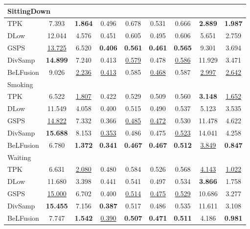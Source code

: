 \documentclass[10pt,twocolumn,letterpaper]{article}
\begin{document}
\begin{table*}[t!]
\begin{minipage}{0.495\textwidth}
\begin{tabular}{lcccccccc@{\hskip 2mm}}
\multicolumn{2}{l}{SittingDown} \\
\midrule
TPK & 7.393 & \textbf{1.864} & 0.496 & 0.678 & 0.531 & 0.666 & \textbf{2.889} & \textbf{1.987} \\
DLow & 12.044 & 4.576 & 0.451 & 0.605 & 0.495 & 0.606 & 5.651 & 2.759 \\
GSPS & \underline{13.725} & 6.520 & \textbf{0.406} & \textbf{0.561} & \textbf{0.461} & \textbf{0.565} & 9.301 & 3.694 \\
DivSamp & \textbf{14.899} & 7.240 & 0.413 & \underline{0.579} & 0.478 & \underline{0.586} & 11.929 & 3.471 \\
BeLFusion & 9.026 & \underline{2.236} & \underline{0.413} & 0.585 & \underline{0.468} & 0.587 & \underline{2.997} & \underline{2.642} \\
\midrule

Smoking \\
\midrule
TPK & 6.522 & \underline{1.807} & 0.422 & 0.529 & 0.509 & 0.560 & \textbf{3.148} & \underline{1.652} \\
DLow & 11.549 & 4.058 & 0.400 & 0.515 & 0.490 & 0.537 & 5.123 & 3.535 \\
GSPS & \underline{14.822} & 7.332 & 0.366 & \underline{0.485} & \underline{0.472} & 0.530 & 11.478 & 4.622 \\
DivSamp & \textbf{15.688} & 8.153 & \underline{0.353} & 0.486 & 0.475 & \underline{0.523} & 14.041 & 4.258 \\
BeLFusion & 6.780 & \textbf{1.372} & \textbf{0.341} & \textbf{0.467} & \textbf{0.467} & \textbf{0.512} & \underline{3.849} & \textbf{0.847} \\
\midrule

Waiting \\
\midrule
TPK & 6.631 & \underline{2.080} & 0.480 & 0.584 & 0.526 & 0.568 & \underline{4.143} & \underline{1.022} \\
DLow & 11.680 & 3.398 & 0.441 & 0.541 & 0.497 & 0.534 & \textbf{3.866} & 1.758 \\
GSPS & \underline{15.000} & 6.702 & 0.400 & \underline{0.514} & \underline{0.475} & \underline{0.529} & 10.686 & 3.277 \\
DivSamp & \textbf{15.455} & 7.156 & \textbf{0.387} & 0.517 & 0.486 & 0.535 & 11.611 & 3.108 \\
BeLFusion & 7.747 & \textbf{1.542} & \underline{0.390} & \textbf{0.507} & \textbf{0.471} & \textbf{0.511} & 4.186 & \textbf{0.981} \\
\midrule


\end{tabular}
\end{minipage}
\end{table*}
\end{document}
